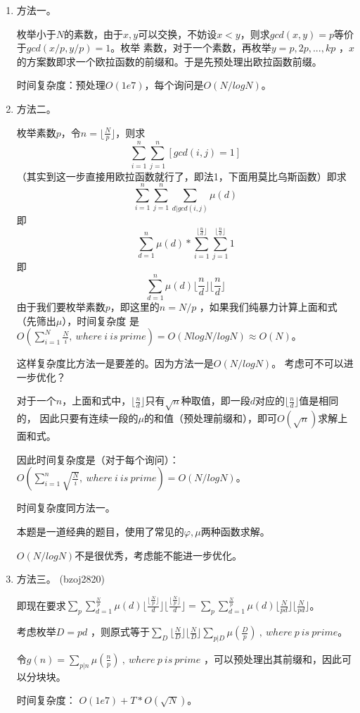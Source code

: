 \begin{solution}
\begin{enumerate}
\item {\color{red}  方法一。}

枚举小于$N$的素数，由于$x,y$可以交换，不妨设$x<y$，则求$gcd(x,y)=p$等价于$gcd(x/p,y/p)=1$。枚举
素数，对于一个素数，再枚举$y=p,2p,...,kp$ ，$x$的方案数即求一个欧拉函数的前缀和。于是先预处理出欧拉函数前缀。

{\heiti 时间复杂度：}预处理$O(1e7)$，每个询问是$O(N/logN)$。 

\item {\color{red}  方法二。}

枚举素数$p$，令$n=\lfloor\frac{N}{p}\rfloor$，则求
$$
\sum_{i=1}^n\sum_{j=1}^{n}[gcd(i,j)=1]
$$
（其实到这一步直接用欧拉函数就行了，即法1，下面用莫比乌斯函数）即求
$$
\sum_{i=1}^n\sum_{j=1}^{n}\sum_{d|gcd(i,j)}\mu(d)
$$
即
$$
\sum_{d=1}^n\mu(d)*\sum_{i=1}^{\lfloor\frac{n}{d}\rfloor}\sum_{j=1}^{\lfloor\frac{n}{d}\rfloor}1
$$
即
$$
\sum_{d=1}^n\mu(d)\lfloor\frac{n}{d}\rfloor\lfloor\frac{n}{d}\rfloor
$$
由于我们要枚举素数$p$，即这里的$n=N/p$  ，如果我们纯暴力计算上面和式（先筛出$\mu$），时间复杂度
是$O(\sum_{i=1}^N\frac{N}{i},\ where \ i \ is \ prime)=O(NlogN/logN)\approx O(N)$。  

这样复杂度比方法一是要差的。因为方法一是$O(N/logN)$。
考虑可不可以进一步优化？  

对于一个$n$，上面和式中，$\lfloor\frac{n}{d}\rfloor$只有$\sqrt{n}$种取值，即一段$d$对应的$\lfloor\frac{n}{d}\rfloor$值是相同的，
因此只要有连续一段的$\mu$的和值（预处理前缀和），即可$O(\sqrt n)$求解上面和式。

{\heiti 因此时间复杂度是（对于每个询问）： $O(\sum_{i=1}^n\sqrt{\frac{N}{i}},\ where \ i \ is \ prime)=O(N/logN)$。

时间复杂度同方法一。

本题是一道经典的题目，使用了常见的$\varphi,\mu$两种函数求解。}

$O(N/logN)$不是很优秀，考虑能不能进一步优化。

\item {\color{red}  方法三。 \quad (bzoj2820)} 

即现在要求$\sum_p\sum_{d=1}^{\frac{N}{p}}\mu(d)\lfloor\frac{\lfloor \frac{N}{p} \rfloor }{d}\rfloor\lfloor\frac{ \lfloor \frac{N}{p} \rfloor}{d}\rfloor=\sum_p\sum_{d=1}^{\frac{N}{p}}\mu(d)\lfloor \frac{N}{pd}\rfloor\lfloor\frac{N}{pd}\rfloor$。      

考虑枚举$D=pd$ ，则原式等于$\sum_D\lfloor \frac{N}{D} \rfloor \lfloor \frac{N}{D} \rfloor\sum_{p|D}\mu(\frac{D}{p})\ ,\ where\ p \ is \ prime$。   

令$g(n)=\sum_{p|n}\mu(\frac{n}{p}) \ ,\ where \ p \ is \ prime $ ，可以预处理出其前缀和，因此可以分块块。  

{\heiti 时间复杂度：}   $O(1e7)+T*O(\sqrt{N})$。
\end{enumerate}
\end{solution}

